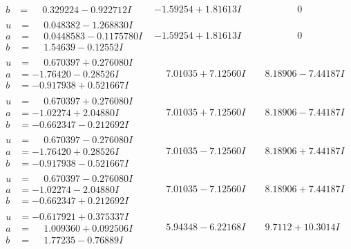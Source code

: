\documentclass[1p]{elsarticle_modified}
\theoremstyle{definition}
\begin{document}
$$\begin{array}{c|c|c}
\begin{aligned}
b &= \phantom{-}0.329224 - 0.922712 I\end{aligned}
 & -1.59254 + 1.81613 I & \phantom{-0.000000 } 0 \\ \hline\begin{aligned}
u &= \phantom{-}0.048382 - 1.268830 I \\
a &= \phantom{-}0.0448583 - 0.1175780 I \\
b &= \phantom{-}1.54639 - 0.12552 I\end{aligned}
 & -1.59254 + 1.81613 I & \phantom{-0.000000 } 0 \\ \hline\begin{aligned}
u &= \phantom{-}0.670397 + 0.276080 I \\
a &= -1.76420 - 0.28526 I \\
b &= -0.917938 + 0.521667 I\end{aligned}
 & \phantom{-}7.01035 + 7.12560 I & \phantom{-}8.18906 - 7.44187 I \\ \hline\begin{aligned}
u &= \phantom{-}0.670397 + 0.276080 I \\
a &= -1.02274 + 2.04880 I \\
b &= -0.662347 - 0.212692 I\end{aligned}
 & \phantom{-}7.01035 + 7.12560 I & \phantom{-}8.18906 - 7.44187 I \\ \hline\begin{aligned}
u &= \phantom{-}0.670397 - 0.276080 I \\
a &= -1.76420 + 0.28526 I \\
b &= -0.917938 - 0.521667 I\end{aligned}
 & \phantom{-}7.01035 - 7.12560 I & \phantom{-}8.18906 + 7.44187 I \\ \hline\begin{aligned}
u &= \phantom{-}0.670397 - 0.276080 I \\
a &= -1.02274 - 2.04880 I \\
b &= -0.662347 + 0.212692 I\end{aligned}
 & \phantom{-}7.01035 - 7.12560 I & \phantom{-}8.18906 + 7.44187 I \\ \hline\begin{aligned}
u &= -0.617921 + 0.375337 I \\
a &= \phantom{-}1.009360 + 0.092506 I \\
b &= \phantom{-}1.77235 - 0.76889 I\end{aligned}
 & \phantom{-}5.94348 - 6.22168 I & \phantom{-}9.7112 + 10.3014 I \\ \hline\begin{aligned}

\end{aligned}
\end{array}$$
\end{document}
